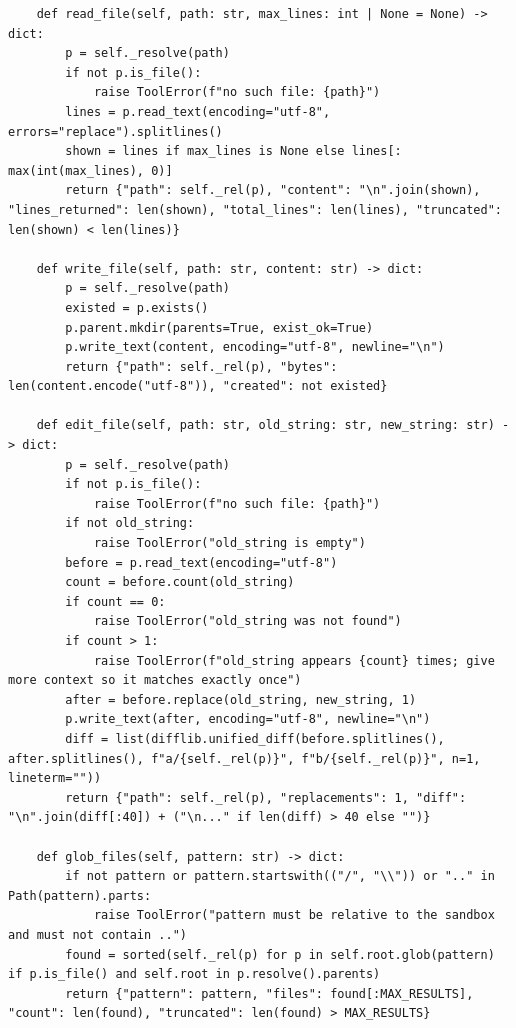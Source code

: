 \documentclass[11pt]{article}
\begin{document}
\begin{lstlisting}
    def read_file(self, path: str, max_lines: int | None = None) -> dict:
        p = self._resolve(path)
        if not p.is_file():
            raise ToolError(f"no such file: {path}")
        lines = p.read_text(encoding="utf-8", errors="replace").splitlines()
        shown = lines if max_lines is None else lines[: max(int(max_lines), 0)]
        return {"path": self._rel(p), "content": "\n".join(shown), "lines_returned": len(shown), "total_lines": len(lines), "truncated": len(shown) < len(lines)}

    def write_file(self, path: str, content: str) -> dict:
        p = self._resolve(path)
        existed = p.exists()
        p.parent.mkdir(parents=True, exist_ok=True)
        p.write_text(content, encoding="utf-8", newline="\n")
        return {"path": self._rel(p), "bytes": len(content.encode("utf-8")), "created": not existed}

    def edit_file(self, path: str, old_string: str, new_string: str) -> dict:
        p = self._resolve(path)
        if not p.is_file():
            raise ToolError(f"no such file: {path}")
        if not old_string:
            raise ToolError("old_string is empty")
        before = p.read_text(encoding="utf-8")
        count = before.count(old_string)
        if count == 0:
            raise ToolError("old_string was not found")
        if count > 1:
            raise ToolError(f"old_string appears {count} times; give more context so it matches exactly once")
        after = before.replace(old_string, new_string, 1)
        p.write_text(after, encoding="utf-8", newline="\n")
        diff = list(difflib.unified_diff(before.splitlines(), after.splitlines(), f"a/{self._rel(p)}", f"b/{self._rel(p)}", n=1, lineterm=""))
        return {"path": self._rel(p), "replacements": 1, "diff": "\n".join(diff[:40]) + ("\n..." if len(diff) > 40 else "")}

    def glob_files(self, pattern: str) -> dict:
        if not pattern or pattern.startswith(("/", "\\")) or ".." in Path(pattern).parts:
            raise ToolError("pattern must be relative to the sandbox and must not contain ..")
        found = sorted(self._rel(p) for p in self.root.glob(pattern) if p.is_file() and self.root in p.resolve().parents)
        return {"pattern": pattern, "files": found[:MAX_RESULTS], "count": len(found), "truncated": len(found) > MAX_RESULTS}


\end{lstlisting}
\end{document}
